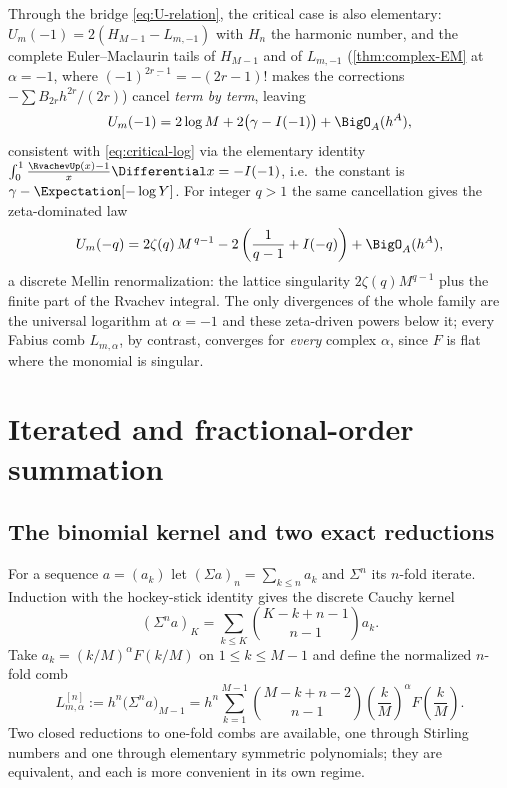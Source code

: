 \documentclass[11pt,oneside]{article}
\numberwithin{equation}{section}
\theoremstyle{definition}
\theoremstyle{remark}
\newcommand{\fall}[2]{#1^{\underline{#2}}}
\begin{document}
\begin{remark}
Through the bridge \eqref{eq:U-relation}, the critical case is also
elementary: $U_m(-1)=2(H_{M-1}-L_{m,-1})$ with $H_n$ the harmonic
number, and the complete Euler--Maclaurin tails of $H_{M-1}$ and of
$L_{m,-1}$ (\cref{thm:complex-EM} at $\alpha=-1$, where
$\fall{(-1)}{2r-1}=-(2r-1)!$ makes the corrections
$-\sum B_{2r}h^{2r}/(2r)$) cancel \emph{term by term}, leaving
\begin{equation}
 U_m(-1)=2\log M+2\bigl(\gamma-I(-1)\bigr)+\BigO_A(h^{A}),
 \label{eq:critical-log-F}
\end{equation}
consistent with \eqref{eq:critical-log} via the elementary identity
$\int_0^1\frac{\RvachevUp(x)-1}{x}\Differential x=-I(-1)$, i.e.\ the constant is
$\gamma-\Expectation[-\log Y]$.  For integer $q>1$ the same cancellation gives
the zeta-dominated law
\begin{equation}
 U_m(-q)
 =2\zeta(q)\,M^{\,q-1}
 -2\left(\frac{1}{q-1}+I(-q)\right)
 +\BigO_A(h^{A}),
 \label{eq:U-q}
\end{equation}
a discrete Mellin renormalization: the lattice singularity
$2\zeta(q)M^{q-1}$ plus the finite part of the Rvachev integral.  The
only divergences of the whole family are the universal logarithm at
$\alpha=-1$ and these zeta-driven powers below it; every Fabius comb
$L_{m,\alpha}$, by contrast, converges for \emph{every} complex
$\alpha$, since $F$ is flat where the monomial is singular.
\end{remark}

\section{Iterated and fractional-order summation}
\label{sec:iterated}

\subsection{The binomial kernel and two exact reductions}

For a sequence $a=(a_k)$ let $(\Sigma a)_n=\sum_{k\le n}a_k$ and
$\Sigma^{n}$ its $n$-fold iterate.  Induction with the hockey-stick
identity gives the discrete Cauchy kernel
\begin{equation}
 (\Sigma^{n}a)_{K}
 =\sum_{k\le K}\binom{K-k+n-1}{n-1}a_k.
 \label{eq:prefix-kernel}
\end{equation}
Take $a_k=(k/M)^{\alpha}F(k/M)$ on $1\le k\le M-1$ and define the
normalized $n$-fold comb
\begin{equation}
 L^{[n]}_{m,\alpha}
 :=h^{n}\bigl(\Sigma^{n}a\bigr)_{M-1}
 =h^{n}\sum_{k=1}^{M-1}\binom{M-k+n-2}{n-1}
 \left(\frac kM\right)^{\alpha}F\!\left(\frac kM\right).
 \label{eq:iter-def}
\end{equation}
Two closed reductions to one-fold combs are available, one through
Stirling numbers and one through elementary symmetric polynomials;
they are equivalent, and each is more convenient in its own regime.
\end{document}
